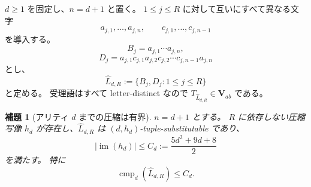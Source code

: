 \documentclass[10pt,a4paper]{ltjsarticle}
\newtheorem{lemma}[theorem]{補題}
\theoremstyle{definition}
\theoremstyle{remark}
\newcommand{\cmp}{\operatorname{cmp}}
\begin{document}
$d\ge1$ を固定し、$n=d+1$ と置く。
$1\le j\le R$ に対して互いにすべて異なる文字
\[
a_{j,1},\ldots,a_{j,n},
\qquad
c_{j,1},\ldots,c_{j,n-1}
\]
を導入する。
\[
B_j=a_{j,1}\cdots a_{j,n},
\]
\[
D_j=a_{j,1}c_{j,1}a_{j,2}c_{j,2}\cdots c_{j,n-1}a_{j,n}
\]
とし、
\[
\widehat L_{d,R}:=\{B_j,D_j:1\le j\le R\}
\]
と定める。
受理語はすべて letter-distinct なので
$T_{\widehat L_{d,R}}\in\mathbf V_{ab}$
である。

\begin{lemma}[アリティ $d$ までの圧縮は有界]
\label{vab:lem:low}
$n=d+1$ とする。
$R$ に依存しない圧縮写像 $h_d$ が存在し、$\widehat L_{d,R}$ は $(d,h_d)$-tuple-substitutable であり、
\[
|\operatorname{im}(h_d)|
\le C_d
:=\frac{5d^2+9d+8}{2}
\]
を満たす。
特に
\[
\cmp_d(\widehat L_{d,R})\le C_d.
\]
\end{lemma}
\end{document}
